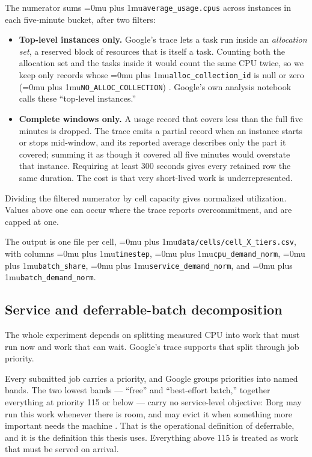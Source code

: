 ﻿\documentclass[12pt]{article}
\newcommand{\codepath}[1]{{\Urlmuskip=0mu plus 1mu\relax\nolinkurl{#1}}}
\begin{document}
The numerator sums \codepath{average_usage.cpus} across instances in each
five-minute bucket, after two filters:

\begin{itemize}
  \item \textbf{Top-level instances only.} Google's trace lets a task run
        inside an \emph{allocation set}, a reserved block of resources that is
        itself a task. Counting both the allocation set and the tasks inside it
        would count the same CPU twice, so we keep only records whose
        \codepath{alloc_collection_id} is null or zero
        (\codepath{NO_ALLOC_COLLECTION}) \cite{googleTraceFormatV3}. Google's
        own analysis notebook calls these ``top-level instances.''
  \item \textbf{Complete windows only.} A usage record that covers less than the
        full five minutes is dropped. The trace emits a partial record when an
        instance starts or stops mid-window, and its reported average describes
        only the part it covered; summing it as though it covered all five
        minutes would overstate that instance. Requiring at least 300 seconds
        gives every retained row the same duration. The cost is that very
        short-lived work is underrepresented.
\end{itemize}

Dividing the filtered numerator by cell capacity gives normalized utilization.
Values above one can occur where the trace reports overcommitment, and are
capped at one.

The output is one file per cell, \codepath{data/cells/cell_X_tiers.csv}, with
columns \codepath{timestep}, \codepath{cpu_demand_norm}, \codepath{batch_share},
\codepath{service_demand_norm}, and \codepath{batch_demand_norm}.

\subsection{Service and deferrable-batch decomposition}
\label{subsec:clusterdata-tier-split}

The whole experiment depends on splitting measured CPU into work that must run
now and work that can wait. Google's trace supports that split through job
priority.

Every submitted job carries a priority, and Google groups priorities into named
bands. The two lowest bands --- ``free'' and ``best-effort batch,'' together
everything at priority 115 or below --- carry no service-level objective: Borg
may run this work whenever there is room, and may evict it when something more
important needs the machine \cite{googleClusterAnalysisColab}. That is the
operational definition of deferrable, and it is the definition this thesis uses.
Everything above 115 is treated as work that must be served on arrival.
\end{document}
